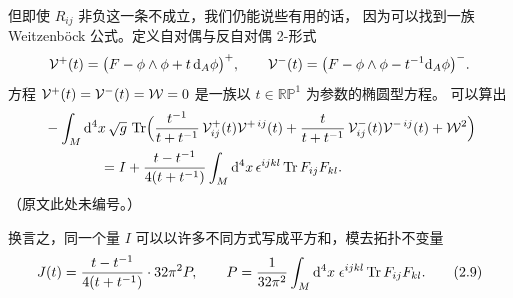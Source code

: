 
但即使 $R_{ij}$ 非负这一条不成立，我们仍能说些有用的话，
因为可以找到一族 Weitzenböck 公式。定义自对偶与反自对偶 2-形式
\[
  \mathcal{V}^{+}(t)=\bigl(F-\phi\wedge\phi+t\,\mathrm{d}_A\phi\bigr)^{+},\qquad
  \mathcal{V}^{-}(t)=\bigl(F-\phi\wedge\phi-t^{-1}\mathrm{d}_A\phi\bigr)^{-}.
\]
方程 $\mathcal{V}^{+}(t)=\mathcal{V}^{-}(t)=\mathcal{W}=0$ 是一族以 $t\in\mathbb{RP}^1$ 为参数的椭圆型方程。
可以算出
\[
\begin{aligned}
  &-\int_M \mathrm{d}^4x\,\sqrt{g}\,\operatorname{Tr}\Bigl(
      \frac{t^{-1}}{t+t^{-1}}\,\mathcal{V}^{+}_{ij}(t)\mathcal{V}^{+\,ij}(t)
     +\frac{t}{t+t^{-1}}\,\mathcal{V}^{-}_{ij}(t)\mathcal{V}^{-\,ij}(t)
     +\mathcal{W}^{2}\Bigr)\\
  &\qquad\qquad = I+\frac{t-t^{-1}}{4(t+t^{-1})}\int_M \mathrm{d}^4x\,
     \epsilon^{ijkl}\operatorname{Tr} F_{ij}F_{kl}.
\end{aligned}
\]
（原文此处未编号。）



换言之，同一个量 $I$ 可以以许多不同方式写成平方和，模去拓扑不变量
\begin{equation}\stepcounter{equation}
  J(t)=\frac{t-t^{-1}}{4(t+t^{-1})}\cdot 32\pi^{2}P,\qquad
  P=\frac{1}{32\pi^{2}}\int_M \mathrm{d}^4x\;\epsilon^{ijkl}\Tr F_{ij}F_{kl}.
  \tag{2.9}\label{eq:2.9}
\end{equation}


